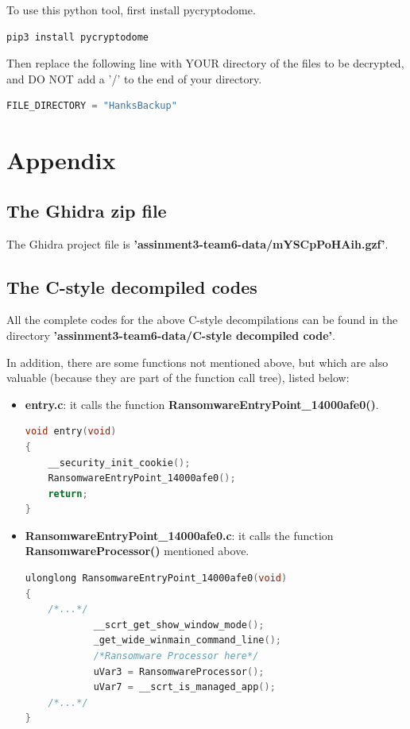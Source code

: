 \documentclass[11pt]{article}
\begin{document}
To use this python tool, first install pycryptodome.
\begin{lstlisting}
pip3 install pycryptodome
\end{lstlisting}

Then replace the following line with YOUR directory of the files to be decrypted, and DO NOT add a '/' to the end of your directory.
\begin{lstlisting}[language=python]
FILE_DIRECTORY = "HanksBackup"
\end{lstlisting}

\newpage
\appendix
\section{Appendix}
\subsection{The Ghidra zip file}
The Ghidra project file is \textbf{'assinment3-team6-data/mYSCpPoHAih.gzf'}.

\subsection{The C-style decompiled codes} \label{C-style decompiled codes}
All the complete codes for the above C-style decompilations can be found in the directory \textbf{'assinment3-team6-data/C-style decompiled code'}.

In addition, there are some functions not mentioned above, but which are also valuable (because they are part of the function call tree), listed below:

\begin{itemize}
    \item \textbf{entry.c}: it calls the function \textbf{RansomwareEntryPoint\_14000afe0()}.
\begin{lstlisting}[language=C++, caption=entry.c]
void entry(void)
{
    __security_init_cookie();
    RansomwareEntryPoint_14000afe0();
    return;
}
\end{lstlisting}

    \item \textbf{RansomwareEntryPoint\_14000afe0.c}: it calls the function \textbf{RansomwareProcessor()} mentioned above.
\begin{lstlisting}[language=C++, caption=Part of RansomwareEntryPoint\_14000afe0.c]
ulonglong RansomwareEntryPoint_14000afe0(void)
{
    /*...*/
            __scrt_get_show_window_mode();
            _get_wide_winmain_command_line();
            /*Ransomware Processor here*/
            uVar3 = RansomwareProcessor();
            uVar7 = __scrt_is_managed_app();
    /*...*/
}
\end{lstlisting}

\end{itemize}
\end{document}
